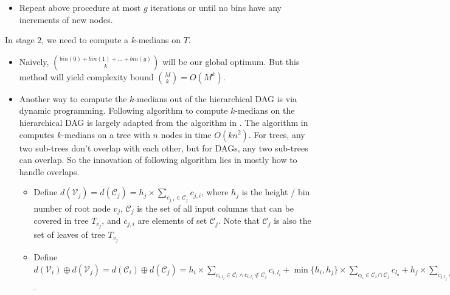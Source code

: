 {\begin{itemize}
    \item Repeat above procedure at most $g$ iterations or until no
    bins have any increments of new nodes. 

\end{itemize}
} %

In stage $2$, we need to compute a $k$-medians on $T$.

\begin{itemize}

    \item Naively, ${bin(0) + bin(1) + \ldots + bin(g) \choose k}$
    will be our global optimum. But this method will yield complexity
    bound ${M \choose k} = O(M^k)$.

    \item Another way to compute the $k$-medians out of the hierarchical
    {DAG} is via dynamic programming. Following algorithm to compute
    $k$-medians on the hierarchical {DAG} is largely adapted from the
    algorithm in \cite{Tamir96}. The algorithm in \cite{Tamir96} computes
    $k$-medians on a tree with $n$ nodes in time $O(kn^2)$.  For trees,
    any two sub-trees don't overlap with each other, but for {DAG}s, any
    two sub-trees can overlap. So the innovation of following algorithm
    lies in mostly how to handle overlaps.

        \begin{itemize}
        
            \item Define $d(\mathcal{V}_j) = d(\mathcal{C}_j) =
            h_j \times \sum_{c_{j,i} \in \mathcal{C}_j} c_{j, i}$,
            where $h_j$ is the height / bin number of root node $v_j$,
            $\mathcal{C}_j$ is the set of all input columns that can
            be covered in tree $T_{v_j}$, and $c_{j, i}$ are elements
            of set $\mathcal{C}_j$.  Note that $\mathcal{C}_j$ is also
            the set of leaves of tree $T_{v_j}$

            \item Define $d(\mathcal{V}_i) \oplus d(\mathcal{V}_j) = d(\mathcal{C}_i) \oplus d(\mathcal{C}_j) = 
            h_i \times \sum_{c_{i, l_i} \in \mathcal{C}_i 
                      \wedge c_{i, l_i} \notin \mathcal{C}_j} c_{i, l_i} + 
     \min \{h_i, h_j\} \times \sum_{c_{l_o} \in \mathcal{C}_i \cap \mathcal{C}_j} c_{l_o} +
            h_j \times \sum_{c_{j, l_j} \in \mathcal{C}_j 
                      \wedge c_{j, l_j} \notin \mathcal{C}_i}$.


\end{itemize}
\end{itemize}
